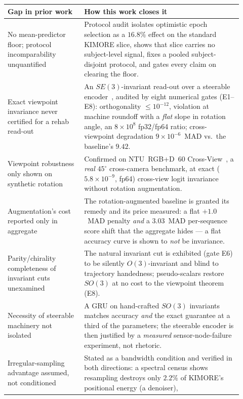 \documentclass[11pt]{article}
\begin{document}
\begin{table}[h]
\centering
\small
\renewcommand{\arraystretch}{1.35}
\begin{tabular}{p{0.30\linewidth} p{0.62\linewidth}}
\toprule
\textbf{Gap in prior work} & \textbf{How this work closes it} \\
\midrule
No mean-predictor floor; protocol incomparability unquantified
  & Protocol audit isolates optimistic epoch selection as a $16.8\%$ effect on the
    standard KIMORE slice, shows that slice carries no subject-level signal, fixes a
    pooled subject-disjoint protocol, and gates every claim on clearing the floor. \\
Exact viewpoint invariance never certified for a rehab read-out
  & An $SE(3)$-invariant read-out over a steerable encoder~\cite{geiger2022e3nn},
    audited by eight numerical gates (E1--E8): orthogonality $\le10^{-12}$, violation
    at machine roundoff with a \emph{flat} slope in rotation angle, an $8\times10^{8}$
    fp32/fp64 ratio; cross-viewpoint degradation $9\times10^{-6}$~MAD vs.\ the
    baseline's $9.42$. \\
Viewpoint robustness only shown on synthetic rotation
  & Confirmed on NTU~RGB+D~$60$ Cross-View~\cite{shahroudy2016ntu,yan2018stgcn}, a
    \emph{real} $45^\circ$ cross-camera benchmark, at exact ($5.8\times10^{-9}$, fp64)
    cross-view logit invariance without rotation augmentation. \\
Augmentation's cost reported only in aggregate
  & The rotation-augmented baseline is granted its remedy and its price measured: a
    flat $+1.0$~MAD penalty \emph{and} a $3.03$~MAD per-sequence score shift that the
    aggregate hides --- a flat accuracy curve is shown to \emph{not} be invariance. \\
Parity/chirality completeness of invariant cuts unexamined
  & The natural invariant cut is exhibited (gate E6) to be silently $O(3)$-invariant
    and blind to trajectory handedness; pseudo-scalars restore $SO(3)$ at no cost to
    the viewpoint theorem (E8). \\
Necessity of steerable machinery not isolated
  & A GRU on hand-crafted $SO(3)$ invariants matches accuracy \emph{and} the exact
    guarantee at a third of the parameters; the steerable encoder is then justified by
    a \emph{measured} sensor-node-failure experiment, not rhetoric. \\
Irregular-sampling advantage assumed, not conditioned
  & Stated as a bandwidth condition and verified in both directions: a spectral census
    shows resampling destroys only $2.2\%$ of KIMORE's positional energy (a denoiser),

\end{tabular}
\end{table}
\end{document}
